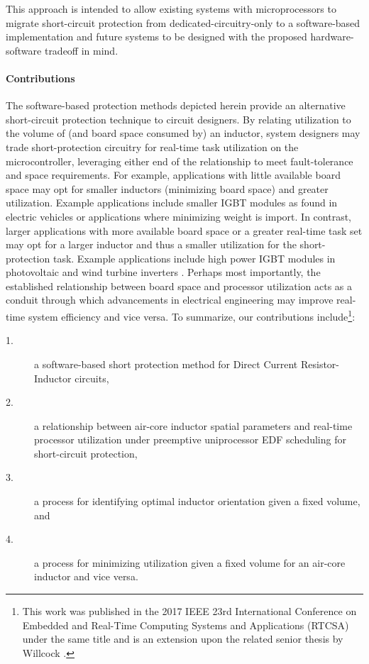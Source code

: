 This approach is intended to allow existing systems with microprocessors to migrate short-circuit protection from dedicated-circuitry-only to a software-based implementation and future systems to be designed with the proposed hardware-software tradeoff in mind.

\paragraph{Contributions}
The software-based protection methods depicted herein provide an alternative short-circuit protection technique to circuit designers. By relating utilization to the volume of (and board space consumed by) an inductor, system designers may trade short-protection circuitry for real-time task utilization on the microcontroller, leveraging either end of the relationship to meet fault-tolerance and space requirements. For example, applications with little available board space may opt for smaller inductors (minimizing board space) and greater utilization. Example applications include smaller IGBT modules as found in electric vehicles or applications where minimizing weight is import\cite{IGBTvehicle}. In contrast, larger applications with more available board space or a greater real-time task set may opt for a larger inductor and thus a smaller utilization for the short-protection task. Example applications include high power IGBT modules in photovoltaic and wind turbine inverters \cite{photoVoltaic}\cite{hiPowerIGBTwind}. Perhaps most importantly, the established relationship between board space and processor utilization acts as a conduit through which advancements in electrical engineering may improve real-time system efficiency and vice versa.
To summarize, our contributions include\footnote{This work was published in the 2017 IEEE 23rd International Conference on Embedded and Real-Time Computing Systems and Applications (RTCSA) under the same title \cite{tufc} and is an extension upon the related senior thesis by Willcock \cite{seniorThesis}.}:%
\begin{description}
\item [1.] a software-based short protection method for Direct Current Resistor-Inductor circuits,
\item [2.] a relationship between air-core inductor spatial parameters and real-time processor utilization under preemptive uniprocessor EDF scheduling for short-circuit protection,
\item [3.] a process for identifying optimal inductor orientation given a fixed volume, and
\item [4.] a process for minimizing utilization given a fixed volume for an air-core inductor and vice versa.
\end{description}


